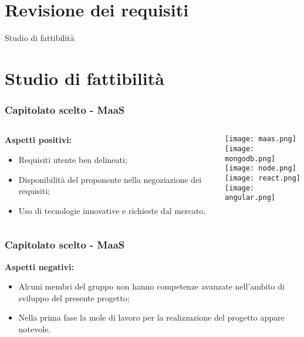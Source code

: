 \section{Revisione dei requisiti}
\begin{frame}
  \titlepage
\end{frame}

\begin{frame}

\begin{center}   \huge Studio di fattibilità \end{center}

\end{frame}

\section{Studio di fattibilità}
\begin{frame}
  \frametitle{Capitolato scelto - MaaS}
  \begin{columns}
    \begin{column}{0.4\textwidth}
      \par{\textbf{Aspetti positivi:}}
      \begin{itemize}
      \item Requisiti utente ben delineati;
      \item Disponibilità del proponente nella negoziazione dei requisiti;
      \item Uso di tecnologie innovative e richieste dal mercato.
      \end{itemize}
    \end{column}
    \begin{column}{0.4\textwidth}
      \texttt{[image: maas.png]}\\
      \texttt{[image: mongodb.png]}\\
      \texttt{[image: node.png]}\\
      \texttt{[image: react.png]}\\
      \texttt{[image: angular.png]}
    \end{column}
  \end{columns}
\end{frame}

\begin{frame}
  \frametitle{Capitolato scelto - MaaS}
  \par{\textbf{Aspetti negativi:}}
  \begin{itemize}
  \item Alcuni membri del gruppo non hanno competenze avanzate nell’ambito di sviluppo del presente progetto;
  \item Nella prima fase la mole di lavoro per la realizzazione del progetto appare notevole.
  \end{itemize}
\end{frame}

